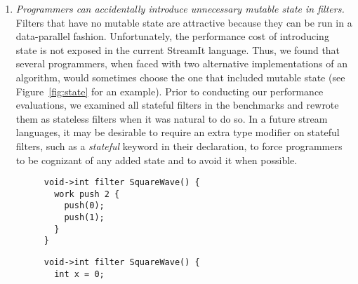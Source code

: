 \begin{enumerate}
\begin{figure}[t]
\centering
{}

\caption[A communication pattern unsuitable for structured streams.]{A
  communication pattern unsuitable for structured streams.  This
  pattern can arise in video compression, where each block informs its
  neighbors of its motion prediction before the next processing
  step.\protect\label{fig:inadequate}}.
\end{figure}

  Finally, there are rare cases in which the structured primitives in
  StreamIt have been inadequate for representing a streaming
  communication pattern.  Figure~\ref{fig:inadequate} illustrates an
  example from video compression, where each parallel filter performs
  a motion prediction for a fixed area of the screen.  Between
  successive frames, each filters shares its prediction with its
  neighbors on either side.  While this could be represented with a
  feedback loop around the entire computation, there would be
  complicated interleaving involved.  This case reflects a broader
  shortcoming, discussed below, that StreamIt is not designed for
  multidimensional data processing.

\item {\it Programmers can accidentally introduce unnecessary mutable
  state in filters.}  Filters that have no mutable state are
  attractive because they can be run in a data-parallel fashion.
  Unfortunately, the performance cost of introducing state is not
  exposed in the current StreamIt language.  Thus, we found that
  several programmers, when faced with two alternative implementations
  of an algorithm, would sometimes choose the one that included
  mutable state (see Figure~\ref{fig:state} for an example).  Prior to
  conducting our performance evaluations, we examined all stateful
  filters in the benchmarks and rewrote them as stateless filters when
  it was natural to do so.  In a future stream languages, it may be
  desirable to require an extra type modifier on stateful filters,
  such as a {\it stateful} keyword in their declaration, to force
  programmers to be cognizant of any added state and to avoid it when
  possible.

\begin{figure}[t]
\hspace{0.1\textwidth}
\begin{minipage}{0.35\textwidth}
\centering
\ninepoint
\begin{verbatim}
void->int filter SquareWave() {
  work push 2 {
    push(0);
    push(1);
  }
}
\end{verbatim}
\end{minipage}
\hspace{0.1\textwidth}
\begin{minipage}{0.35\textwidth}
\centering
\ninepoint
\begin{verbatim}
void->int filter SquareWave() {
  int x = 0;
 

\end{verbatim}
\end{minipage}
\end{figure}
\end{enumerate}
